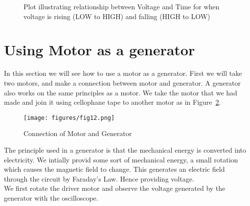 \documentclass[12pt,a4paper]{report}
\begin{document}
\begin{figure}[htbp]
\centering
{}
	\caption{Plot illustrating relationship between Voltage and Time for when voltage is rising (LOW to HIGH) and falling (HIGH to LOW)}
\label{fig:voltage_time}
\end{figure}


\section{Using Motor as a generator}
In this section we will see how to use a motor as a generator. 
First we will take two motors, and make a connection between motor and generator. 
A generator also works on the same principles as a motor.
We take the motor that we had made and join it using cellophane tape to another motor as in Figure~\ref{fig:fig12}.
\begin{figure}
	\texttt{[image: figures/fig12.png]}
	\caption{Connection of Motor and Generator}\label{fig:fig12}
\end{figure}
The principle used in a generator is that the mechanical energy is converted into electricity. We intially provid some sort of mechanical energy, a small rotation which causes the magnetic field to 
change. This generates an electric field through the circuit by Faraday's Law. 
Hence providing voltage.\\
We first rotate the driver motor and observe the voltage generated by the generator with the oscilloscope. 
\end{document}
